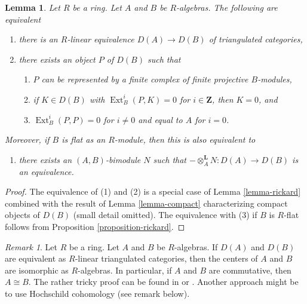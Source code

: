 \documentclass{stacks-project}
\theoremstyle{plain}
\newtheorem{lemma}[subsection]{Lemma}
\theoremstyle{definition}
\theoremstyle{remark}
\newtheorem{remark}[subsection]{Remark}
\numberwithin{equation}{subsection}
\def\Ext{\mathop{\mathrm{Ext}}\nolimits}
\begin{document}
\begin{lemma}
\label{lemma-rickard-rings}
Let $R$ be a ring.
Let $A$ and $B$ be $R$-algebras. The following are equivalent
\begin{enumerate}
\item there is an $R$-linear equivalence $D(A) \to D(B)$
of triangulated categories,
\item there exists an object $P$ of $D(B)$ such that
\begin{enumerate}
\item $P$ can be represented by a finite complex
of finite projective $B$-modules,
\item if $K \in D(B)$ with $\Ext^i_B(P, K) = 0$ for
$i \in \mathbf{Z}$, then $K = 0$, and
\item $\Ext^i_B(P, P) = 0$ for $i \not = 0$ and
equal to $A$ for $i= 0$.
\end{enumerate}
\end{enumerate}
Moreover, if $B$ is flat as an $R$-module, then this is also
equivalent to
\begin{enumerate}
\item[(3)] there exists an $(A, B)$-bimodule $N$ such that
$- \otimes_A^\mathbf{L} N : D(A) \to D(B)$ is an equivalence.
\end{enumerate}
\end{lemma}

\begin{proof}
The equivalence of (1) and (2) is a special case of
Lemma \ref{lemma-rickard} combined with the result of
Lemma \ref{lemma-compact} characterizing compact objects of $D(B)$
(small detail omitted).
The equivalence with (3) if $B$ is $R$-flat follows from
Proposition \ref{proposition-rickard}.
\end{proof}

\begin{remark}
\label{remark-centers}
Let $R$ be a ring. Let $A$ and $B$ be $R$-algebras.
If $D(A)$ and $D(B)$ are equivalent as $R$-linear triangulated
categories, then the centers of $A$ and $B$ are isomorphic
as $R$-algebras. In particular, if $A$ and $B$ are commutative,
then $A \cong B$. The rather tricky proof can be found in
\cite[Proposition 9.2]{Rickard} or \cite[Proposition 6.3.2]{KZ}.
Another approach might be to use Hochschild cohomology (see
remark below).
\end{remark}
\end{document}
